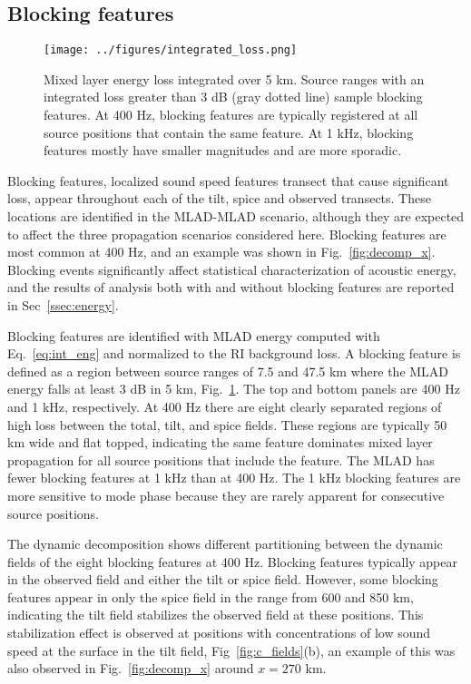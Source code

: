 \documentclass[preprint,NumberedRefs]{JASA}
\begin{document}
\subsection{Blocking features}\label{ssec:blocking}
\begin{figure}
\texttt{[image: ../figures/integrated\_loss.png]}
    \caption{Mixed layer energy loss integrated over 5 km. Source ranges with an integrated loss greater than 3 dB (gray dotted line) sample blocking features. At 400 Hz, blocking features are typically registered at all source positions that contain the same feature. At 1 kHz, blocking features mostly have smaller magnitudes and are more sporadic.}
    \label{fig:blocking}
\end{figure}

Blocking features, localized sound speed features transect that cause significant loss, appear throughout each of the tilt, spice and observed transects. These locations are identified in the MLAD-MLAD scenario, although they are expected to affect the three propagation scenarios considered here. Blocking features are most common at 400 Hz, and an example was shown in Fig.~\ref{fig:decomp_x}. Blocking events significantly affect statistical characterization of acoustic energy, and the results of analysis both with and without blocking features are reported in Sec~\ref{ssec:energy}.

Blocking features are identified with MLAD energy computed with Eq.~\eqref{eq:int_eng} and normalized to the RI background loss. A blocking feature is defined as a region between source ranges of 7.5 and 47.5 km where the MLAD energy falls at least 3 dB in 5 km, Fig.~\ref{fig:blocking}. The top and bottom panels are 400 Hz and 1 kHz, respectively. At 400 Hz there are eight clearly separated regions of high loss between the total, tilt, and spice fields. These regions are typically 50 km wide and flat topped, indicating the same feature dominates mixed layer propagation for all source positions that include the feature. The MLAD has fewer blocking features at 1 kHz than at 400 Hz. The 1 kHz blocking features are more sensitive to mode phase because they are rarely apparent for consecutive source positions.

The dynamic decomposition shows different partitioning between the dynamic fields of the eight blocking features at 400 Hz. Blocking features typically appear in the observed field and either the tilt or spice field. However, some blocking features appear in only the spice field in the range from 600 and 850 km, indicating the tilt field stabilizes the observed field at these positions. This stabilization effect is observed at positions with concentrations of low sound speed at the surface in the tilt field, Fig~\ref{fig:c_fields}(b), an example of this was also observed in Fig.~\ref{fig:decomp_x} around $x=270$ km.
\end{document}
